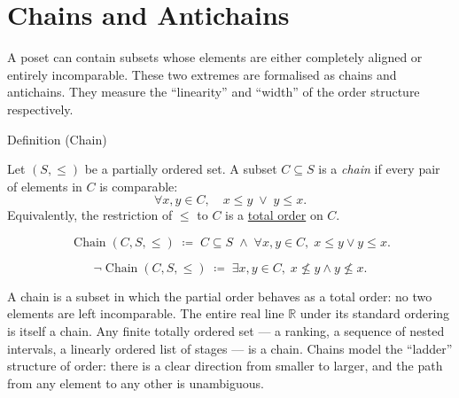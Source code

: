 
\section{Chains and Antichains}
\label{sec:chains-antichains}

\begin{remark*}
A poset can contain subsets whose elements are either completely aligned
or entirely incomparable.  These two extremes are formalised as chains and
antichains.  They measure the ``linearity'' and ``width'' of the order
structure respectively.
\end{remark*}


\begin{definitionbox}{Definition (Chain)}
\begin{definition}[Chain]
\label{def:lattice-chain}
Let $(S, \leq)$ be a partially ordered set.  A subset $C \subseteq S$ is a
\emph{chain} if every pair of elements in $C$ is comparable:
\[
\forall x, y \in C, \quad x \leq y \;\lor\; y \leq x.
\]
Equivalently, the restriction of $\leq$ to $C$ is a
\hyperref[def:lattice-order-total-order]{total order} on $C$.
\end{definition}
\end{definitionbox}

\begin{remark*}
\[
\operatorname{Chain}(C, S, \leq)
\;\coloneqq\;
C \subseteq S
\;\land\;
\forall x, y \in C,\; x \leq y \lor y \leq x.
\]
\end{remark*}

\begin{remark*}
\[
\neg\operatorname{Chain}(C, S, \leq)
\;\coloneqq\;
\exists x, y \in C,\; x \not\leq y \land y \not\leq x.
\]
\end{remark*}

\begin{remark*}[Interpretation]
A chain is a subset in which the partial order behaves as a total order:
no two elements are left incomparable.  The entire real line $\mathbb{R}$
under its standard ordering is itself a chain.  Any finite totally ordered
set --- a ranking, a sequence of nested intervals, a linearly ordered list
of stages --- is a chain.  Chains model the ``ladder'' structure of order:
there is a clear direction from smaller to larger, and the path from any
element to any other is unambiguous.
\end{remark*}

